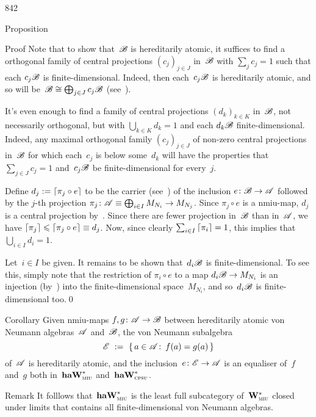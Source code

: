 \begin{parsec}{842}
\begin{point}{30}{Proposition}
\begin{point}{40}{Proof}
Note that to show that~$\mathscr{B}$ is hereditarily atomic,
it suffices to find a orthogonal family of central
projections $(c_j)_{j\in J}$ in~$\mathscr{B}$
with $\sum_j c_j=1$ 
such that  each $c_j\mathscr{B}$ is finite-dimensional.
Indeed, then each~$c_j\mathscr{B}$ is hereditarily atomic,
and so will be~$\mathscr{B}\cong \bigoplus_{j\in J} c_j\mathscr{B}$
(see~).

It's even enough to find a family of central projections
$(d_k)_{k\in K}$ in~$\mathscr{B}$,
not necessarily orthogonal, but
with $\bigcup_{k\in K} d_k =1$
and each $d_k\mathscr{B}$  finite-dimensional.
Indeed, any maximal orthogonal 
family $(c_j)_{j\in J}$
of non-zero central projections in~$\mathscr{B}$
for which each~$c_j$ is below some~$d_k$
will have the properties
that $\sum_{j\in J} c_j =1$
and~$c_j\mathscr{B}$ be finite-dimensional for every~$j$.

Define $d_j := \left\lceil\pi_j\circ e\right\rceil$
to be the carrier (see~)
of the inclusion $e\colon \mathscr{B}\to\mathscr{A}$
followed by the $j$-th projection
$\pi_j\colon \mathscr{A}\equiv\bigoplus_{i\in I}M_{N_i}\to M_{N_j}$.
Since $\pi_j\circ e$ is a nmiu-map,
    $d_j$ is a central projection by~.
Since there are fewer projection in~$\mathscr{B}$ than in~$\mathscr{A}$,
we have $\left\lceil\pi_j\right\rceil\leqslant \left\lceil\pi_j\circ e\right\rceil\equiv d_j$.
Now, since clearly $\sum_{i\in I}\left\lceil\pi_i\right\rceil=1$,
this implies that $\bigcup_{i\in I} d_i =1$.

Let~$i\in I$ be given.
It remains to be shown that~$d_i\mathscr{B}$ is finite-dimensional.
To see this, simply note that the restriction
of $\pi_i\circ e$ to a map $d_i\mathscr{B} \to M_{N_i}$
    is an injection (by~)
    into the finite-dimensional space~$M_{N_i}$,
    and so~$d_i\mathscr{B}$ is finite-dimensional too.\qed
\end{point}
\end{point}
\begin{point}{50}{Corollary}%
Given nmiu-maps
$f,g\colon \mathscr{A}\to\mathscr{B}$
between hereditarily atomic
von Neumann algebras~$\mathscr{A}$ and~$\mathscr{B}$,
the von Neumann subalgebra
\begin{equation*}
    \mathscr{E} \ :=\  \{\,a\in\mathscr{A}\colon\, f(a)=g(a)\,\}
\end{equation*}
of~$\mathscr{A}$
is hereditarily atomic,
and the inclusion~$e\colon \mathscr{E}\to\mathscr{A}$
is an equaliser of~$f$ and~$g$ both in~$\mathbf{haW}^*_{\text{\textsc{miu}}}$
and~$\mathbf{haW}^*_{\text{\textsc{cpsu}}}$.
\end{point}
\begin{point}{60}{Remark}%
It folllows that~$\mathbf{haW}^*_{\text{\textsc{miu}}}$
is the least full subcategory of~$\mathbf{W}^*_{\text{\textsc{miu}}}$
closed under limits
that contains all finite-dimensional von Neumann algebras.
\end{point}
\end{parsec}
